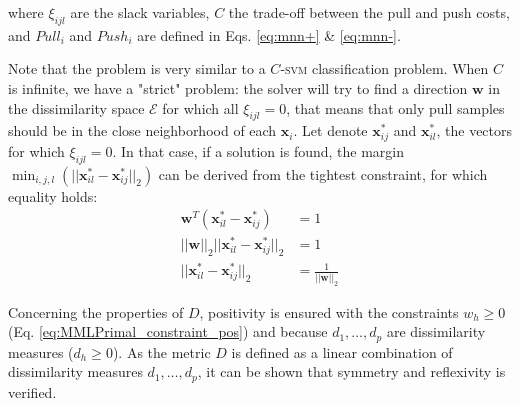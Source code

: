 \noindent where $\xi_{ijl}$ are the slack variables, $C$ the trade-off between the pull and push costs, and $Pull_i$ and $Push_i$ are defined in Eqs. \ref{eq:mnn+} \& \ref{eq:mnn-}. 

Note that the problem is very similar to a $C$-\textsc{svm} classification problem. When $C$ is infinite, we have a "strict" problem: the solver will try to find a direction $\textbf{w}$ in the dissimilarity space $\mathcal{E}$ for which all $\xi_{ijl} = 0$, that means that only pull samples should be in the close neighborhood of each $\textbf{x}_i$. Let denote $\textbf{x}_{ij}^*$ and $\textbf{x}_{il}^*$, the vectors for which $\xi_{ijl} = 0$. In that case, if a solution is found, the margin $\displaystyle  \min_{i,j,l}(||\textbf{x}_{il}^* - \textbf{x}_{ij}^*||_2)$ can be derived from the tightest constraint, for which equality holds:
\begin{align*}
	\textbf{w}^T(\textbf{x}_{il}^* - \textbf{x}_{ij}^*) & = 1 \\
	||\textbf{w}||_2  ||\textbf{x}_{il}^* - \textbf{x}_{ij}^*||_2 & = 1 \\
	||\textbf{x}_{il}^* - \textbf{x}_{ij}^*||_2 & = \frac{1}{||\textbf{w}||_2}
\end{align*}

 


\noindent Concerning the properties of $D$, positivity is ensured with the constraints $w_h \geq 0$ (Eq. \ref{eq:MMLPrimal_constraint_pos}) and because $d_1, \ldots, d_p$ are dissimilarity measures ($d_h \geq 0$). As the metric $D$ is defined as a linear combination of dissimilarity measures $d_1, \ldots, d_p$, it can be shown that symmetry and reflexivity is verified.

